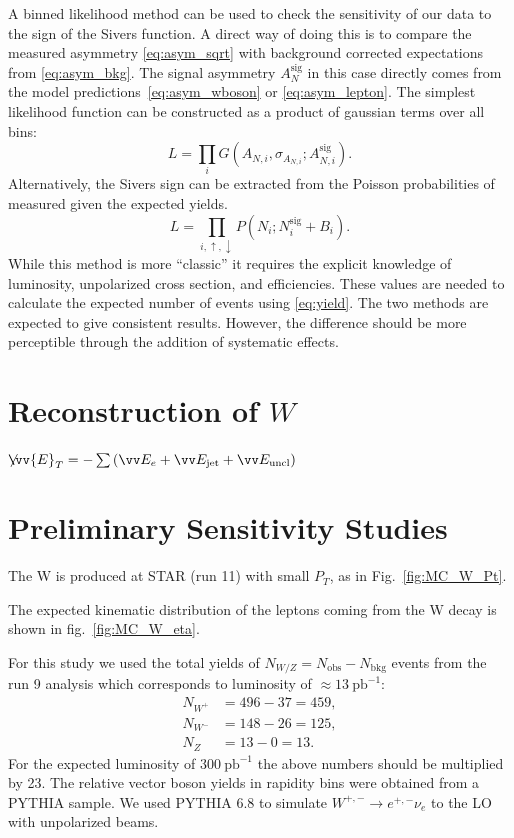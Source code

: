 \documentclass[12pt]{article}
\newcommand{\missET}{\not\!\!\vv{E}_T}
\begin{document}
A binned likelihood method can be used to check the sensitivity of our data to
the sign of the Sivers function. A direct way of doing this is to compare the
measured asymmetry \eqref{eq:asym_sqrt} with background corrected expectations
from \eqref{eq:asym_bkg}. The signal asymmetry $A^\text{sig}_N$ in this case
directly comes from the model predictions~\eqref{eq:asym_wboson} or
\eqref{eq:asym_lepton}. The simplest likelihood function can be constructed as a
product of gaussian terms over all bins:
%
\begin{equation}
L = \prod\limits_i G(A_{N,i}, \sigma_{A_{N,i}}; A^\text{sig}_{N,i}).
\end{equation}
%
Alternatively, the Sivers sign can be extracted from the Poisson probabilities
of measured given the expected yields.
%
\begin{equation}
L = \prod\limits_{i,\uparrow,\downarrow} P(N_i; N^\text{sig}_{i} + B_i).
\end{equation}
%
While this method is more ``classic'' it requires the explicit knowledge of
luminosity, unpolarized cross section, and efficiencies. These values are needed
to calculate the expected number of events using \eqref{eq:yield}. The two
methods are expected to give consistent results. However, the difference should
be more perceptible through the addition of systematic effects.



\section{Reconstruction of $W$}

$\missET = - \sum \left( \vv E_e + \vv E_\text{jet} +  \vv E_\text{uncl} \right)$


\section{Preliminary Sensitivity Studies}


The W is produced at STAR (run 11) with small $P_T$, as in
Fig.~\ref{fig:MC_W_Pt}.

The expected kinematic distribution of the leptons coming from the W decay is
shown in fig.~\ref{fig:MC_W_eta}.

For this study we used the total yields of $N_{W/Z} = N_\text{obs} -
N_\text{bkg}$ events from the run 9 analysis \cite{WCrossSecRun9} which
corresponds to luminosity of $\approx 13~\text{pb}^{-1}$:
%
\begin{align*}
N_{W^+} &= 496 - 37 = 459,\\
N_{W^-} &= 148 - 26 = 125,\\
N_Z &= 13 - 0 = 13.
\end{align*}
%
For the expected luminosity of $300~\text{pb}^{-1}$ the above numbers should be
multiplied by 23. The relative vector boson yields in rapidity bins were
obtained from a PYTHIA sample. We used PYTHIA 6.8 to simulate $W^{+,-}
\rightarrow e^{+,-}\nu_e$ to the LO with unpolarized beams. 
\end{document}
